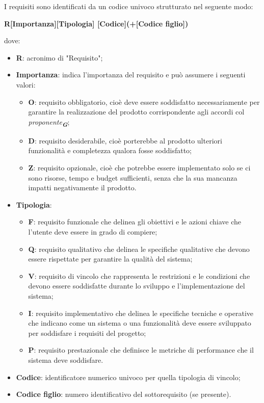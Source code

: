 I requisiti sono identificati da un codice univoco strutturato nel seguente modo:\\
\begin{center}
    \textbf{R[Importanza][Tipologia] [Codice](+[Codice figlio])}
\end{center}
dove:
\begin{itemize}
    \item \textbf{R}: acronimo di "Requisito";
    \item \textbf{Importanza}: indica l’importanza del requisito e può assumere i seguenti valori:
    \begin{itemize}
        \item \textbf{O}: requisito obbligatorio, cioè deve essere soddisfatto necessariamente per garantire la realizzazione del prodotto corrispondente agli accordi col \emph{proponente}\textsubscript{\textit{\textbf{G}}};
        \item \textbf{D}: requisito desiderabile, cioè porterebbe al prodotto ulteriori funzionalità e completezza qualora fosse soddisfatto;
        \item \textbf{Z}: requisito opzionale, cioè che potrebbe essere implementato solo se ci sono risorse, tempo e budget sufficienti, senza che la sua mancanza impatti negativamente il prodotto.
    \end{itemize}
    \item \textbf{Tipologia}:
        \begin{itemize} 
            \item \textbf{F}: requisito funzionale che delinea gli obiettivi e le azioni chiave che l’utente deve essere in grado di compiere;
            \item \textbf{Q}: requisito qualitativo che delinea le specifiche qualitative che devono essere rispettate per garantire la qualità del sistema;
            \item \textbf{V}: requisito di vincolo che rappresenta le restrizioni e le condizioni che devono essere soddisfatte durante lo sviluppo e l’implementazione del sistema;
            \item \textbf{I}: requisito implementativo che delinea le specifiche tecniche e operative che indicano come un sistema o una funzionalità deve essere sviluppato per soddisfare i requisiti del progetto;  
            \item \textbf{P}: requisito prestazionale che definisce le metriche di performance che il sistema deve soddisfare. 
        \end{itemize}
    \item \textbf{Codice}: identificatore numerico univoco per quella tipologia di vincolo;
    \item \textbf{Codice figlio}: numero identificativo del sottorequisito (se presente).
\end{itemize}

